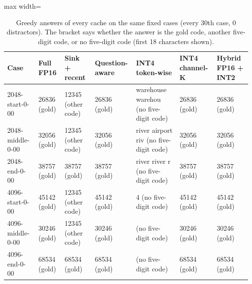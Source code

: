 \begin{table}[!htb]
\centering
\scriptsize
\setlength{\tabcolsep}{3.5pt}
\caption{Greedy answers of every cache on the same fixed cases (every 30th case, 0 distractors). The bracket says whether the answer is the gold code, another five-digit code, or no five-digit code (first 18 characters shown).}
\label{tab:t2canswers}
\begin{adjustbox}{max width=\linewidth}
\begin{tabular}{lp{1.5cm}p{1.6cm}p{1.6cm}p{2.3cm}p{1.6cm}p{1.6cm}}
\toprule
Case & Full FP16 & Sink + recent & Question-aware & INT4 token-wise & INT4 channel-K & Hybrid FP16 + INT2 \\
\midrule
2048-start-0-00 & 26836 (gold) & 12345 (other code) & 26836 (gold) & warehouse warehou (no five-digit code) & 26836 (gold) & 26836 (gold) \\
2048-middle-0-00 & 32056 (gold) & 12345 (other code) & 32056 (gold) & river airport riv (no five-digit code) & 32056 (gold) & 32056 (gold) \\
2048-end-0-00 & 38757 (gold) & 38757 (gold) & 38757 (gold) & river  river  r (no five-digit code) & 38757 (gold) & 38757 (gold) \\
4096-start-0-00 & 45142 (gold) & 12345 (other code) & 45142 (gold) & 4 (no five-digit code) & 45142 (gold) & 45142 (gold) \\
4096-middle-0-00 & 30246 (gold) & 12345 (other code) & 30246 (gold) & (no five-digit code) & 30246 (gold) & 30246 (gold) \\
4096-end-0-00 & 68534 (gold) & 68534 (gold) & 68534 (gold) & (no five-digit code) & 68534 (gold) & 68534 (gold) \\
\bottomrule
\end{tabular}
\end{adjustbox}
\end{table}
